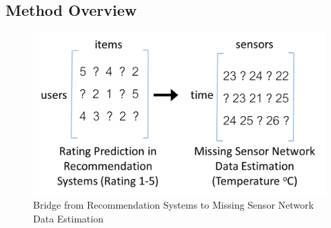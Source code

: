

\subsection{Method Overview }

\begin{figure}[H]
\centering
\includegraphics[scale=0.35]{recommend_imputation.png}
\caption{Bridge from Recommendation Systems to Missing Sensor Network Data Estimation} \label{recommend_imputation}
\end{figure}

